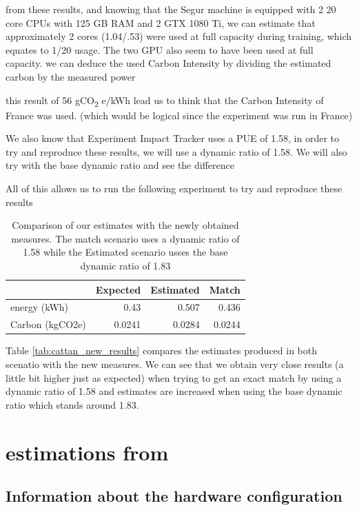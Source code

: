 \documentclass[11pt]{article}
\begin{document}
from these results, and knowing that the Segur machine is equipped with
2 20 core CPUs with 125 GB RAM  and 2 GTX 1080 Ti,
we can estimate that approximately 2 cores (1.04/.53) were used at
full capacity during training, which equates to 1/20 usage. The two
GPU also seem to have been used at full capacity.
we can deduce the used Carbon Intensity by dividing the estimated
carbon by the measured power

this result of 56 gCO\textsubscript{2} e/kWh lead us to think that the Carbon
Intensity of France was used. (which would be logical since the
experiment was run in France)

We also know that Experiment Impact Tracker uses a \gls{PUE} of 1.58, in
order to try and reproduce these results, we will use a dynamic ratio
of 1.58. We will also try with the base dynamic ratio and see the difference

All of this allows us to run the following experiment to try and
reproduce these results

\begin{table}[htbp]
\caption{Comparison of our estimates with the newly obtained measures. The match scenario uses a dynamic ratio of 1.58 while the Estimated scenario usses the base dynamic ratio of 1.83}
\centering
\begin{tabular}{lrrr}
 & Expected & Estimated & Match\\
\hline
energy (kWh) & 0.43 & 0.507 & 0.436\\
Carbon (kgCO2e) & 0.0241 & 0.0284 & 0.0244\\
\end{tabular}
\end{table}


Table \ref{tab:cattan_new_results} compares the estimates produced in
both scenatio with the new measures. We can see that we obtain very close results (a little bit higher just
as expected) when trying to get an
exact match by using a dynamic ratio of 1.58 and estimates are
increased when using the base dynamic ratio which stands
around 1.83.

\section{estimations from \cite{Strubell2019energy}}
\label{sec:orgcb9cb8e}
\label{sec:strubell}
\subsection{Information about the hardware configuration}
\label{sec:org407501f}
\end{document}
